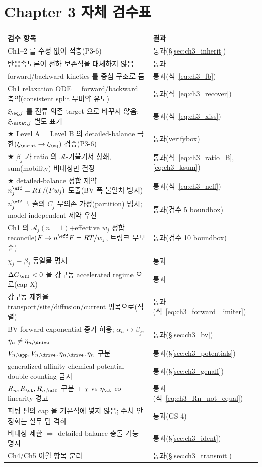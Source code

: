 \section{Chapter 3 자체 검수표}\label{sec:ch3_selfcheck}
{\small
\begin{longtable}{p{} p{}}
\toprule 검수 항목 & 결과 \\ \midrule \endhead
Ch1--2 를 수정 없이 적층(P3-6) & 통과(\S\ref{sec:ch3_inherit}) \\
반응속도론이 전하 보존식을 대체하지 않음 & 통과 \\
forward/backward kinetics 를 중심 구조로 둠 & 통과(식~\eqref{eq:ch3_fb}) \\
Ch1 relaxation ODE = forward/backward 축약(consistent split 무비약 유도) & 통과(식~\eqref{eq:ch3_recover}) \\
$\xi_{\eq,j}$ 를 전류 의존 target 으로 바꾸지 않음; $\xi_{\sstat,j}$ 별도 표기 & 통과(식~\eqref{eq:ch3_xiss}) \\
★ Level A = Level B 의 detailed-balance 극한($\xi_{\sstat}\to\xi_{\eq}$) 검증(P3-6) & 통과(verifybox) \\
★ $\beta_j$ 가 ratio 의 $\mathcal A$-기울기서 상쇄, sum(mobility) 비대칭만 결정 & 통과(식~\eqref{eq:ch3_ratio_B},\eqref{eq:ch3_ksum}) \\
★ detailed-balance 정합 제약 $n_j^{\eff}=RT/(Fw_j)$ 도출(BV-폭 불일치 방지) & 통과(식~\eqref{eq:ch3_neff}) \\
$n_j^{\eff}$ 도출의 $C_j$ 무의존 가정(partition) 명시; model-independent 제약 우선 & 통과(검수 5 boundbox) \\
Ch1 의 $\mathcal A_j(n{=}1)$+effective $w_j$ 정합 reconcile($F\to n^{\eff}F=RT/w_j$, 트렁크 무모순) & 통과(검수 10 boundbox) \\
$\chi_j\equiv\beta_j$ 동일물 명시 & 통과 \\
$\Delta G_{\eff}<0$ 을 강구동 accelerated regime 으로(cap X) & 통과 \\
강구동 제한을 transport/site/diffusion/current 병목으로(직렬) & 통과(식~\eqref{eq:ch3_forward_limiter}) \\
BV forward exponential 증가 허용; $\alpha_n\leftrightarrow\beta_j$, $\eta_n\ne\eta_{n,\drive}$ & 통과(\S\ref{sec:ch3_bv}) \\
$V_{n,\app},V_{n,\drive},\eta_{n,\drive},\eta_n$ 구분 & 통과(\S\ref{sec:ch3_potentials}) \\
generalized affinity chemical-potential double counting 금지 & 통과(\S\ref{sec:ch3_genaff}) \\
$R_n,R_{\ct},R_{n,\eff}$ 구분 + $\chi$ vs $\eta_{\ct}$ co-linearity 경고 & 통과(식~\eqref{eq:ch3_Rn_not_equal}) \\
피팅 편의 cap 을 기본식에 넣지 않음; 수치 안정화는 실무 팁 격하 & 통과(GS-4) \\
비대칭 제한 $\Rightarrow$ detailed balance 충돌 가능 명시 & 통과(\S\ref{sec:ch3_ident}) \\
Ch4/Ch5 이월 항목 분리 & 통과(\S\ref{sec:ch3_transmit}) \\
\bottomrule
\end{longtable}
}

